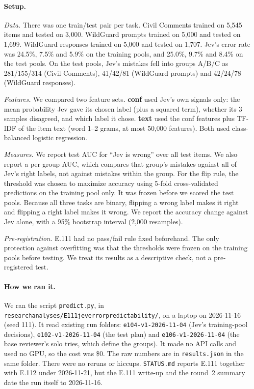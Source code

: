 \documentclass[11pt]{article}
\renewcommand{\_}{\origunderscore\allowbreak}
\begin{document}
\paragraph{Setup.}
\emph{Data.} There was one train/test pair per task. Civil Comments trained on 5{,}545 items and tested on 3{,}000. WildGuard prompts trained on 5{,}000 and tested on 1{,}699. WildGuard responses trained on 5{,}000 and tested on 1{,}707. Jev's error rate was 24.5\%, 7.5\% and 5.9\% on the training pools, and 25.0\%, 9.7\% and 8.4\% on the test pools. On the test pools, Jev's mistakes fell into groups A/B/C as 281/155/314 (Civil Comments), 41/42/81 (WildGuard prompts) and 42/24/78 (WildGuard responses).

\emph{Features.} We compared two feature sets. \textbf{conf} used Jev's own signals only: the mean probability Jev gave its chosen label (plus a squared term), whether its 3 samples disagreed, and which label it chose. \textbf{text} used the conf features plus TF-IDF of the item text (word 1--2 grams, at most 50{,}000 features). Both used class-balanced logistic regression.

\emph{Measures.} We report test AUC for ``Jev is wrong'' over all test items. We also report a per-group AUC, which compares that group's mistakes against all of Jev's right labels, not against mistakes within the group. For the flip rule, the threshold was chosen to maximize accuracy using 5-fold cross-validated predictions on the training pool only. It was frozen before we scored the test pools. Because all three tasks are binary, flipping a wrong label makes it right and flipping a right label makes it wrong. We report the accuracy change against Jev alone, with a 95\% bootstrap interval (2{,}000 resamples).

\emph{Pre-registration.} E.111 had no pass/fail rule fixed beforehand. The only protection against overfitting was that the thresholds were frozen on the training pools before testing. We treat its results as a descriptive check, not a pre-registered test.

\paragraph{How we ran it.}
\begin{sloppypar}
We ran the script \texttt{predict.py}, in \texttt{research\_analyses/\allowbreak E111\_jev\_\allowbreak error\_\allowbreak predictability/}, on a laptop on 2026-11-16 (seed 111). It read existing run folders: \texttt{e104-v1-2026-11-04} (Jev's training-pool decisions), \texttt{e102-v1-2026-11-04} (the test plan) and \texttt{e106-v1-2026-11-04} (the base reviewer's solo tries, which define the groups). It made no API calls and used no GPU, so the cost was \$0. The raw numbers are in \texttt{results.json} in the same folder. There were no reruns or hiccups. \texttt{STATUS.md} reports E.111 together with E.112 under 2026-11-21, but the E.111 write-up and the round~2 summary date the run itself to 2026-11-16.
\end{sloppypar}
\end{document}
